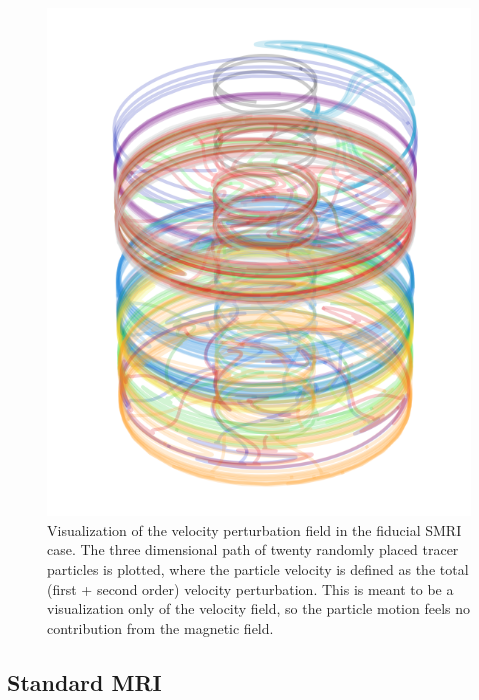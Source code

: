 \documentclass{emulateapj}
\begin{document}
\begin{figure}
\centering
\includegraphics[width=\columnwidth]{../figures/widegap_3D_vel_screenshot.png}
\caption{Visualization of the velocity perturbation field in the fiducial SMRI case. The three dimensional path of twenty randomly placed tracer particles is plotted, where the particle velocity is defined as the total (first + second order) velocity perturbation. This is meant to be a visualization only of the velocity field, so the particle motion feels no contribution from the magnetic field.}
\end{figure}

\subsection{Standard MRI}
\end{document}
